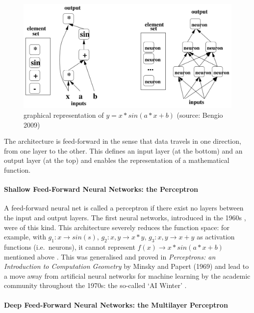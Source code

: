 \documentclass[a4paper,11pt]{article}
\begin{document}
\begin{figure}[h!]
	\centering
	\includegraphics[scale=0.3]{images/NN_math_rep.png}
	\caption{graphical representation of $y = x*sin(a*x+b)$ (source: Bengio 2009)}
    \label{f11}
\end{figure}

The architecture is feed-forward in the sense that data travels in one direction, from one layer to the other. This defines an input layer (at the bottom) and an output layer (at the top) and enables the representation of a mathematical function.

\paragraph{Shallow Feed-Forward Neural Networks: the Perceptron} 

A feed-forward neural net is called a perceptron if there exist no layers between the input and output layers. The first neural networks, introduced in the 1960s \cite{DL-book}, were of this kind. This architecture severely reduces the function space: for example, with $g_{1}: x \rightarrow sin(s)$, $g_{2}: x,y \rightarrow x*y$, $g_{3}: x,y \rightarrow x+y$ as activation functions (i.e.\ neurons), it cannot represent $f(x) \rightarrow x*sin(a*x+b)$ mentioned above \cite{DL-book}. This was generalised and proved in \textit{Perceptrons: an Introduction to Computation Geometry} by Minsky and Papert (1969) and lead to a move away from artificial neural networks for machine learning by the academic community throughout the 1970s: the so-called `AI Winter' \cite{Russel & Norvig}. 

\paragraph{Deep Feed-Forward Neural Networks: the Multilayer Perceptron} 
\end{document}

